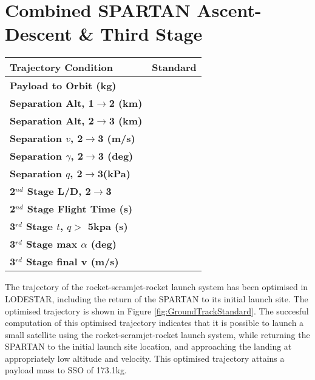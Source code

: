 \section{Combined SPARTAN Ascent-Descent \& Third Stage}
\begin{table}
	\centering

\begin{tabular}{l c } 
	\hline \textbf{Trajectory Condition}
	&Standard
	\\
	\hline \textbf{Payload to Orbit (kg)}
	& \PayloadToOrbitStandard
	\\
	\textbf{Separation Alt, 1$\rightarrow$2 (km)}
	& \firstsecondSeparationAltStandard
	\\
	\textbf{Separation Alt, 2$\rightarrow$3 (km)}
	& \secondthirdSeparationAltStandard
	\\
	\textbf{Separation $v$, 2$\rightarrow$3 (m/s)}
	& \secondthirdSeparationvStandard
	\\
	\textbf{Separation $\gamma$, 2$\rightarrow$3 (deg)}
	& \secondthirdSeparationgammaStandard
	\\
	\textbf{Separation $q$, 2$\rightarrow$3(kPa)}
	& \secondthirdSeparationqStandard
	\\
	\textbf{2$^{nd}$ Stage L/D, 2$\rightarrow$3}
	& \secondthirdSeparationLDStandard
	\\
	\textbf{2$^{nd}$ Stage Flight Time (s)}
	& \secondFlightTimeStandard
	\\
	\textbf{3$^{rd}$ Stage $t$, $q >$ 5kpa (s)}
	& \thirdqOverFiveStandard
	\\
	\textbf{3$^{rd}$ Stage max $\alpha$ (deg)}
	& \thirdmaxAoAStandard
	\\
	\textbf{3$^{rd}$ Stage final v (m/s)}
	& \thirdcircvStandard
	\\
	\hline 
\end{tabular} 
\end{table}

The trajectory of the rocket-scramjet-rocket launch system has been optimised in LODESTAR, including the return of the SPARTAN to its initial launch site. The optimised trajectory is shown in Figure \ref{fig:GroundTrackStandard}. The succesful computation of this optimised trajectory indicates that it is possible to launch a small satellite using the rocket-scramjet-rocket launch system, while returning the SPARTAN to the initial launch site location, and approaching the landing at appropriately low altitude and velocity. 
This optimised trajectory attains a payload mass to SSO of 173.1kg. 

